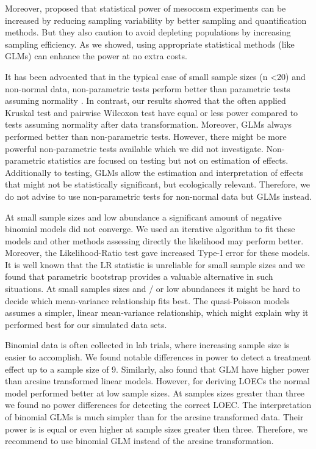 \documentclass{scrartcl}
\begin{document}
Moreover, \citet{brock_minimum_2015} proposed that statistical power of mesocosm experiments can be increased by reducing sampling variability by better sampling and quantification methods. 
But they also caution to avoid depleting populations by increasing sampling efficiency.
As we showed, using appropriate statistical methods (like GLMs) can enhance the power at no extra costs.

It has been advocated that in the typical case of small sample sizes (n \textless 20) and non-normal data, non-parametric tests perform better than parametric tests assuming normality \citep{wang_making_2011}.
In contrast, our results showed that the often applied Kruskal test and pairwise Wilcoxon test have equal or less power compared to tests assuming normality after data transformation.
Moreover, GLMs always performed better than non-parametric tests. 
However, there might be more powerful non-parametric tests available \citep{konietschke_rank-based_2012} which we did not investigate.
Non-parametric statistics are focused on testing but not on estimation of effects.
Additionally to testing, GLMs allow the estimation and interpretation of effects that might not be statistically significant, but ecologically relevant.
Therefore, we do not advise to use non-parametric tests for non-normal data but GLMs instead.

At small sample sizes and low abundance a significant amount of negative binomial models did not converge.
We used an iterative algorithm to fit these models \citep{venables_modern_2002} and other methods assessing directly the likelihood may perform better.
Moreover, the Likelihood-Ratio test gave increased Type-I error for these models.
It is well known that the LR statistic is unreliable for small sample sizes \citep{bolker_generalized_2009,wilks_large-sample_1938} and we found that parametric bootstrap provides a valuable alternative in such situations.
At small samples sizes and / or low abundances it might be hard to decide which mean-variance relationship fits best.
The quasi-Poisson models assumes a simpler, linear mean-variance relationship, which might explain why it performed best for our simulated data sets. 


Binomial data is often collected in lab trials, where increasing sample size is easier to accomplish. 
We found notable differences in power to detect a treatment effect up to a sample size of 9.
Similarly, \citet{warton_arcsine_2011} also found that GLM have higher power than arcsine transformed linear models.
However, for deriving LOECs the normal model performed better at low sample sizes. At samples sizes greater than three we found no power differences for detecting the correct LOEC.
The interpretation of binomial GLMs is much simpler than for the arcsine transformed data.
Their power is is equal or even higher at sample sizes greater then three. 
Therefore, we recommend to use binomial GLM instead of the arcsine transformation.
\end{document}
